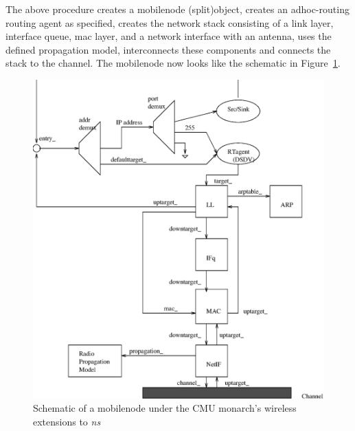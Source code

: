 The above procedure creates a mobilenode (split)object, creates an adhoc-routing routing agent as specified, creates the network stack consisting of a link layer, interface queue, mac layer, and a network interface with an antenna, uses the defined propagation model, interconnects these components and connects the stack to the channel. The mobilenode now looks like the schematic in Figure~\ref{fig:mobilenode-dsdv}.  
\begin{figure}
    \centerline{\includegraphics{dsdv}}
    \caption{Schematic of a mobilenode under the CMU monarch's
      wireless extensions to \emph{ns}} 
    \label{fig:mobilenode-dsdv} 
\end{figure}


